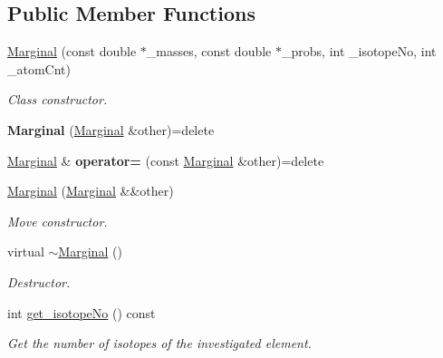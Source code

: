 \subsection*{Public Member Functions}
\begin{DoxyCompactItemize}
\item 
\mbox{\hyperlink{class_iso_spec_1_1_marginal_a46be0c1cf5b169a54056997ba404183c}{Marginal}} (const double $\ast$\+\_\+masses, const double $\ast$\+\_\+probs, int \+\_\+isotope\+No, int \+\_\+atom\+Cnt)
\begin{DoxyCompactList}\small\item\em Class constructor. \end{DoxyCompactList}\item 
\mbox{\label{class_iso_spec_1_1_marginal_a02e8f92f8f9add352840f5dba8de5e06}} 
{\bfseries Marginal} (\mbox{\hyperlink{class_iso_spec_1_1_marginal}{Marginal}} \&other)=delete
\item 
\mbox{\label{class_iso_spec_1_1_marginal_a9120cad240058afc3705951d80d28a10}} 
\mbox{\hyperlink{class_iso_spec_1_1_marginal}{Marginal}} \& {\bfseries operator=} (const \mbox{\hyperlink{class_iso_spec_1_1_marginal}{Marginal}} \&other)=delete
\item 
\mbox{\label{class_iso_spec_1_1_marginal_ad60fff17fa2c68ea2cd7f183a635379e}} 
\mbox{\hyperlink{class_iso_spec_1_1_marginal_ad60fff17fa2c68ea2cd7f183a635379e}{Marginal}} (\mbox{\hyperlink{class_iso_spec_1_1_marginal}{Marginal}} \&\&other)
\begin{DoxyCompactList}\small\item\em Move constructor. \end{DoxyCompactList}\item 
\mbox{\label{class_iso_spec_1_1_marginal_ad44004fa1e83c4a53d431ca403ce3ae4}} 
virtual \mbox{\hyperlink{class_iso_spec_1_1_marginal_ad44004fa1e83c4a53d431ca403ce3ae4}{$\sim$\+Marginal}} ()
\begin{DoxyCompactList}\small\item\em Destructor. \end{DoxyCompactList}\item 
int \mbox{\hyperlink{class_iso_spec_1_1_marginal_a05aa80c3fa77a0406102731934db1a83}{get\+\_\+isotope\+No}} () const
\begin{DoxyCompactList}\small\item\em Get the number of isotopes of the investigated element. \end{DoxyCompactList}\item 

\end{DoxyCompactItemize}
